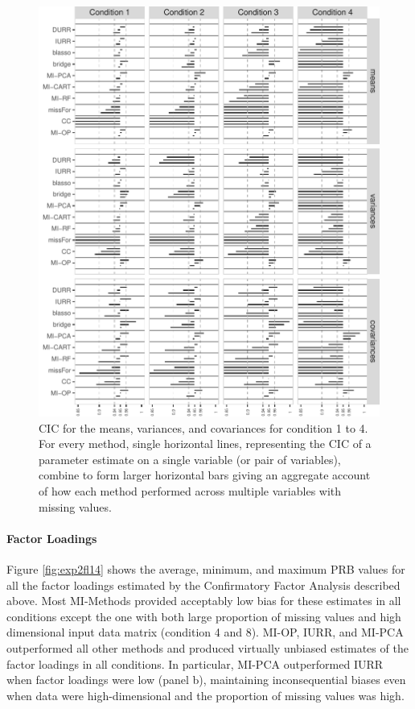 \begin{figure}
	\includegraphics{../../output/graphs/exp2_semR_ci_58_summy.pdf}
\caption{CIC for the means, variances, and covariances for condition 1 to 4.
	For every method, single horizontal lines, representing the CIC of a parameter estimate on 
	a single variable (or pair of variables), combine to form larger horizontal bars giving an 
	aggregate account of how each method performed across multiple variables with missing values.
}
\label{fig:exp2cir58}
\end{figure}

\FloatBarrier

	\paragraph{Factor Loadings}
	Figure \ref{fig:exp2fl14} shows the average, minimum, and maximum PRB values for all the factor loadings 
	estimated by the Confirmatory Factor Analysis described above. 
	Most MI-Methods provided acceptably low bias for these estimates in all conditions except the one with 
	both large proportion of missing values and high dimensional input data matrix (condition 4 and 8).
	MI-OP, IURR, and MI-PCA outperformed all other methods and produced virtually unbiased estimates
	of the factor loadings in all conditions.
	In particular, MI-PCA outperformed IURR when factor loadings were low (panel b), 
	maintaining inconsequential biases even when data were high-dimensional and the proportion of missing 
	values was high.


